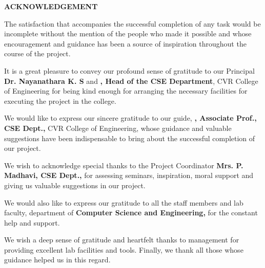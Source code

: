 \documentclass[../Report.tex]{subfiles}
\begin{document}
\begin{center}
    \textbf{ACKNOWLEDGEMENT}
\end{center}

The satisfaction that accompanies the successful completion of any task would be incomplete without the mention of the people who made it 
possible and whose encouragement and guidance has been a source of inspiration throughout the course of the project.\par

It is a great pleasure to convey our profound sense of gratitude to our Principal \textbf{Dr. Nayanathara K. S} and 
\textbf{\hodName, Head of the CSE Department}, CVR College of Engineering for being kind enough for arranging the necessary facilities 
for executing the project in the college.\par

We would like to express our sincere gratitude to our guide, \textbf{\guideName, Associate Prof., CSE Dept.,} CVR College of Engineering,
whose guidance and valuable suggestions have been indispensable to bring
about the successful completion of our project.\par

We wish to acknowledge special thanks to the Project Coordinator \textbf{Mrs. P. Madhavi, CSE Dept.,} for assessing seminars, 
inspiration, moral support and giving us valuable suggestions in our project.\par

We would also like to express our gratitude to all the staff members and lab faculty, department of 
\textbf{Computer Science and Engineering,} \textbf{\collegeName} for the constant help and support.\par

We wish a deep sense of gratitude and heartfelt thanks to management for providing excellent lab facilities and tools. Finally, 
we thank all those whose guidance helped us in this regard. \par

\pagebreak
\end{document}
